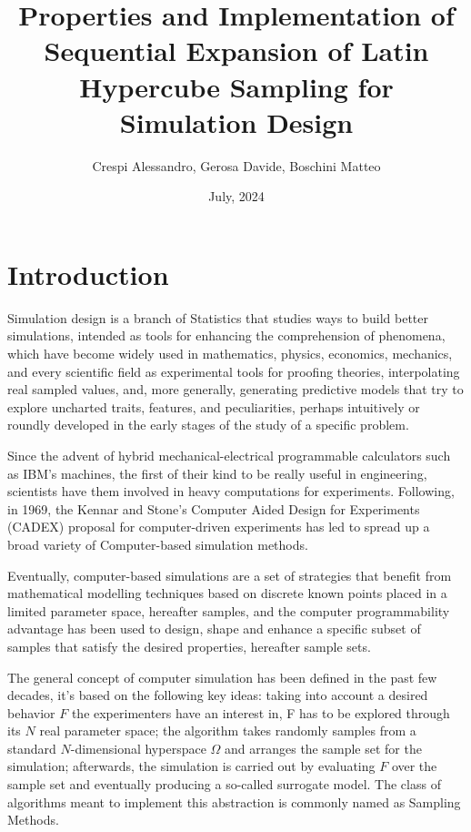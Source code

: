 \documentclass[12pt]{article}
\begin{document}
\title{Properties and Implementation of Sequential Expansion of Latin Hypercube Sampling for Simulation Design}
\author{Crespi Alessandro, Gerosa Davide, Boschini Matteo}
\date{July, 2024}
\maketitle


\section{Introduction}
Simulation design is a branch of Statistics that studies ways to build better simulations, intended as tools for enhancing the comprehension of phenomena, which have become widely used in mathematics, physics, economics, mechanics, and every scientific field as experimental tools for proofing theories, interpolating real sampled values, and, more generally, generating predictive models that try to explore uncharted traits, features, and peculiarities, perhaps intuitively or roundly developed in the early stages of the study of a specific problem.

Since the advent of hybrid mechanical-electrical programmable calculators such as IBM's machines, the first of their kind to be really useful in engineering, scientists have them involved in heavy computations for experiments. Following, in 1969, the Kennar and Stone's Computer Aided Design for Experiments (CADEX) proposal for computer-driven experiments has led to spread up a broad variety of Computer-based simulation methods.

Eventually, computer-based simulations are a set of strategies that benefit from mathematical modelling techniques based on discrete known points placed in a limited parameter space, hereafter samples, and the computer programmability advantage has been used to design, shape and enhance a specific subset of samples that satisfy the desired properties, hereafter sample sets. 

The general concept of computer simulation has been defined in the past few decades, it's based on the following key ideas: taking into account a desired behavior $ F $ the experimenters have an interest in, F has to be explored through its $ N $ real parameter space; the algorithm takes randomly samples from a standard $ N $-dimensional hyperspace $ \Omega $ and arranges the sample set for the simulation; afterwards, the simulation is carried out by evaluating $ F $ over the sample set and eventually producing a so-called surrogate model. The class of algorithms meant to implement this abstraction is commonly named as Sampling Methods.
\end{document}
